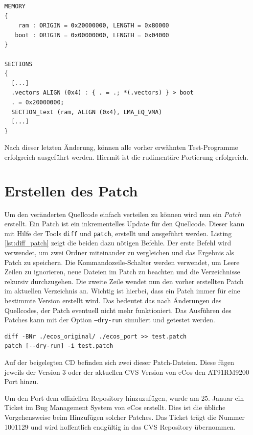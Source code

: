 \documentclass[
  a4paper,					%
  twoside,
  DIV=calc,     				%
  bibliography=totoc,
  cleardoublepage=empty,
  ngerman,     					%
  final       					%
]{scrbook}
\begin{document}
\begin{lstlisting}[frame=single, float, caption={Verbesserters Linker-Skript}, label={lst:linker_skript_fixed}]
MEMORY
{
    ram : ORIGIN = 0x20000000, LENGTH = 0x80000
   boot : ORIGIN = 0x00000000, LENGTH = 0x04000
}

SECTIONS
{
  [...]
  .vectors ALIGN (0x4) : { . = .; *(.vectors) } > boot
  . = 0x20000000;
  SECTION_text (ram, ALIGN (0x4), LMA_EQ_VMA)
  [...]
}
\end{lstlisting}

Nach dieser letzten Änderung, können alle vorher erwähnten Test-Programme erfolgreich ausgeführt werden. Hiermit ist die rudimentäre Portierung erfolgreich.




\section{Erstellen des Patch}
\label{sec:Patch}
Um den veränderten Quellcode einfach verteilen zu können wird nun ein \emph{Patch} erstellt. Ein Patch ist ein inkrementelles Update für den Quellcode. Dieser kann mit Hilfe der Tools \texttt{diff} und \texttt{patch}, erstellt und ausgeführt werden. Listing \ref{lst:diff_patch} zeigt die beiden dazu nötigen Befehle. Der erste Befehl wird verwendet, um zwei Ordner miteinander zu vergleichen und das Ergebnis als Patch zu speichern. Die Kommandozeile-Schalter werden verwendet, um Leere Zeilen zu ignorieren, neue Dateien im Patch zu beachten und die Verzeichnisse rekursiv durchzugehen. Die zweite Zeile wendet nun den vorher erstellten Patch im aktuellen Verzeichnis an. Wichtig ist hierbei, dass ein Patch immer für eine bestimmte Version erstellt wird. Das bedeutet das nach Änderungen des Quellcodes, der Patch eventuell nicht mehr funktioniert. Das Ausführen des Patches kann mit der Option \texttt{--dry-run} simuliert und getestet werden.

\begin{lstlisting}[frame=single, float, caption={Diff und Patch Befehle}, label={lst:diff_patch}]
diff -BNr ./ecos_original/ ./ecos_port >> test.patch
patch [--dry-run] -i test.patch
\end{lstlisting}

Auf der beigelegten CD befinden sich zwei dieser Patch-Dateien. Diese fügen jeweils der Version 3 oder der aktuellen CVS Version von eCos den AT91RM9200 Port hinzu.

Um den Port dem offiziellen Repository hinzuzufügen, wurde am 25. Januar ein Ticket im Bug Management System von eCos erstellt. Dies ist die übliche Vorgehensweise beim Hinzufügen solcher Patches. Das Ticket trägt die Nummer 1001129 und wird hoffentlich endgültig in das CVS Repository übernommen.
\end{document}
